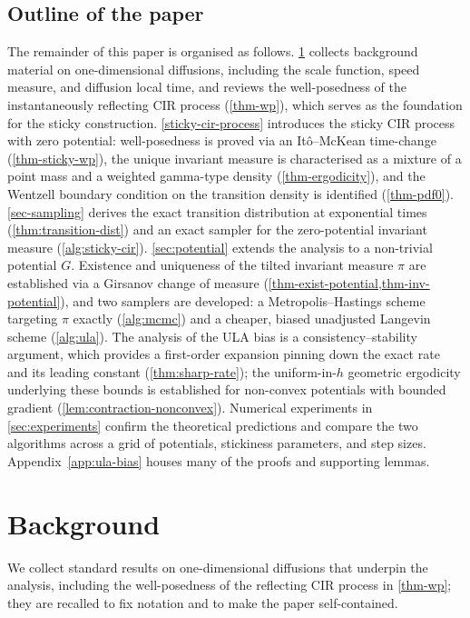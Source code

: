 \documentclass[aap,preprint]{imsart}
\numberwithin{equation}{section}
\theoremstyle{plain}
\theoremstyle{definition}
\begin{document}
\subsection{Outline of the paper}
The remainder of this paper is organised as follows.
\cref{sec:background} collects background material on one-dimensional
diffusions, including the scale function, speed measure, and diffusion local
time, and reviews the well-posedness of the instantaneously reflecting CIR
process (\cref{thm-wp}), which serves as the foundation for
the sticky construction.
\cref{sticky-cir-process} introduces the sticky CIR process with
zero potential: well-posedness is proved via an It\^o--McKean time-change
(\cref{thm-sticky-wp}), the unique invariant measure is
characterised as a mixture of a point mass and a weighted gamma-type density
(\cref{thm-ergodicity}), and the Wentzell boundary condition on the
transition density is identified (\cref{thm-pdf0}).
\cref{sec-sampling} derives  the exact transition distribution at
exponential times (\cref{thm:transition-dist}) and an exact sampler for the
zero-potential invariant measure (\cref{alg:sticky-cir}).
\cref{sec:potential} extends the analysis to a non-trivial potential $G$.
Existence and uniqueness of the tilted invariant measure $\pi$ are established
via a Girsanov change of measure (\cref{thm-exist-potential,thm-inv-potential}),
and two samplers are developed: a Metropolis--Hastings scheme targeting $\pi$
exactly (\cref{alg:mcmc}) and a cheaper, biased unadjusted Langevin scheme
(\cref{alg:ula}).  The analysis of the ULA bias is  a consistency--stability argument, which provides a first-order expansion pinning
down the exact rate and its leading constant (\cref{thm:sharp-rate}); the
uniform-in-$h$ geometric ergodicity underlying these bounds is established for
non-convex potentials with bounded gradient
(\cref{lem:contraction-nonconvex}). 
Numerical experiments in \cref{sec:experiments}
confirm the theoretical predictions and compare the two algorithms across a
grid of potentials, stickiness parameters, and step sizes.  
Appendix~\ref{app:ula-bias} houses many of the proofs and supporting lemmas.
%
\section{Background}\label{sec:background}

We collect standard results on one-dimensional diffusions that
underpin the analysis, including the well-posedness of the reflecting CIR process in \cref{thm-wp}; they are recalled to fix notation
and to make the paper self-contained.  
\end{document}
